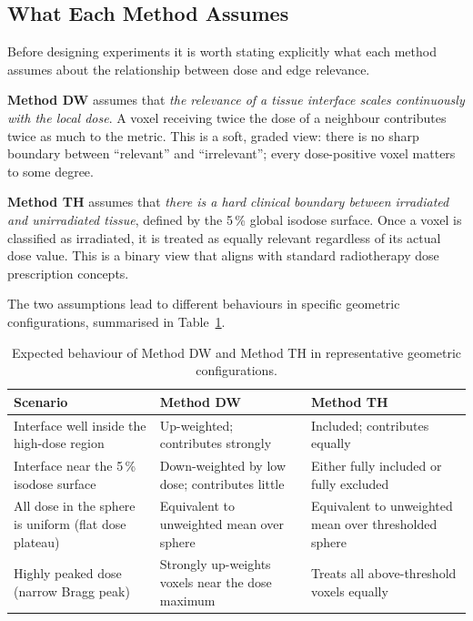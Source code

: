 \documentclass[11pt,a4paper]{article}
\begin{document}
\subsection{What Each Method Assumes}

Before designing experiments it is worth stating explicitly what each method
assumes about the relationship between dose and edge relevance.

\textbf{Method DW} assumes that \emph{the relevance of a tissue interface scales
continuously with the local dose}.
A voxel receiving twice the dose of a neighbour contributes twice as much to
the metric.
This is a soft, graded view: there is no sharp boundary between
``relevant'' and ``irrelevant''; every dose-positive voxel matters to some
degree.

\textbf{Method TH} assumes that \emph{there is a hard clinical boundary between
irradiated and unirradiated tissue}, defined by the 5\,\% global isodose
surface.
Once a voxel is classified as irradiated, it is treated as equally relevant
regardless of its actual dose value.
This is a binary view that aligns with standard radiotherapy dose prescription
concepts.

The two assumptions lead to different behaviours in specific geometric
configurations, summarised in Table~\ref{tab:method_differences}.

\begin{table}[h!]
    \centering
    \caption{Expected behaviour of Method DW and Method TH in representative
             geometric configurations.}
    \label{tab:method_differences}
    \begin{tabular}{>{\raggedright\arraybackslash}p{4.5cm}
                    >{\raggedright\arraybackslash}p{4.5cm}
                    >{\raggedright\arraybackslash}p{4.5cm}}
        \toprule
        Scenario & Method DW & Method TH \\
        \midrule
        Interface well inside the high-dose region
        & Up-weighted; contributes strongly
        & Included; contributes equally \\[4pt]
        Interface near the 5\,\% isodose surface
        & Down-weighted by low dose; contributes little
        & Either fully included or fully excluded \\[4pt]
        All dose in the sphere is uniform (flat dose plateau)
        & Equivalent to unweighted mean over sphere
        & Equivalent to unweighted mean over thresholded sphere \\[4pt]
        Highly peaked dose (narrow Bragg peak)
        & Strongly up-weights voxels near the dose maximum
        & Treats all above-threshold voxels equally \\
        \bottomrule
    \end{tabular}
\end{table}
\end{document}
